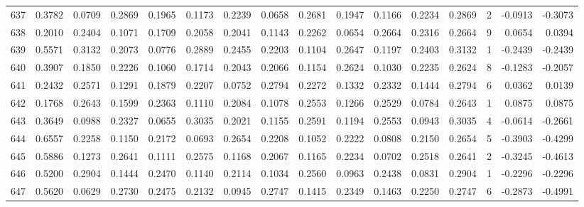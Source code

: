 \begin{tabular}{lrrrrrrrrrrrrrrr}
637 &      0.3782 &  0.0709 &  0.2869 &  0.1965 &  0.1173 &  0.2239 &  0.0658 &  0.2681 &  0.1947 &  0.1166 &   0.2234 &     0.2869 &      2 &                   -0.0913 &                    -0.3073 \\
638 &      0.2010 &  0.2404 &  0.1071 &  0.1709 &  0.2058 &  0.2041 &  0.1143 &  0.2262 &  0.0654 &  0.2664 &   0.2316 &     0.2664 &      9 &                    0.0654 &                     0.0394 \\
639 &      0.5571 &  0.3132 &  0.2073 &  0.0776 &  0.2889 &  0.2455 &  0.2203 &  0.1104 &  0.2647 &  0.1197 &   0.2403 &     0.3132 &      1 &                   -0.2439 &                    -0.2439 \\
640 &      0.3907 &  0.1850 &  0.2226 &  0.1060 &  0.1714 &  0.2043 &  0.2066 &  0.1154 &  0.2624 &  0.1030 &   0.2235 &     0.2624 &      8 &                   -0.1283 &                    -0.2057 \\
641 &      0.2432 &  0.2571 &  0.1291 &  0.1879 &  0.2207 &  0.0752 &  0.2794 &  0.2272 &  0.1332 &  0.2332 &   0.1444 &     0.2794 &      6 &                    0.0362 &                     0.0139 \\
642 &      0.1768 &  0.2643 &  0.1599 &  0.2363 &  0.1110 &  0.2084 &  0.1078 &  0.2553 &  0.1266 &  0.2529 &   0.0784 &     0.2643 &      1 &                    0.0875 &                     0.0875 \\
643 &      0.3649 &  0.0988 &  0.2327 &  0.0655 &  0.3035 &  0.2021 &  0.1155 &  0.2591 &  0.1194 &  0.2553 &   0.0943 &     0.3035 &      4 &                   -0.0614 &                    -0.2661 \\
644 &      0.6557 &  0.2258 &  0.1150 &  0.2172 &  0.0693 &  0.2654 &  0.2208 &  0.1052 &  0.2222 &  0.0808 &   0.2150 &     0.2654 &      5 &                   -0.3903 &                    -0.4299 \\
645 &      0.5886 &  0.1273 &  0.2641 &  0.1111 &  0.2575 &  0.1168 &  0.2067 &  0.1165 &  0.2234 &  0.0702 &   0.2518 &     0.2641 &      2 &                   -0.3245 &                    -0.4613 \\
646 &      0.5200 &  0.2904 &  0.1444 &  0.2470 &  0.1140 &  0.2114 &  0.1034 &  0.2560 &  0.0963 &  0.2438 &   0.0831 &     0.2904 &      1 &                   -0.2296 &                    -0.2296 \\
647 &      0.5620 &  0.0629 &  0.2730 &  0.2475 &  0.2132 &  0.0945 &  0.2747 &  0.1415 &  0.2349 &  0.1463 &   0.2250 &     0.2747 &      6 &                   -0.2873 &                    -0.4991 \\

\end{tabular}

